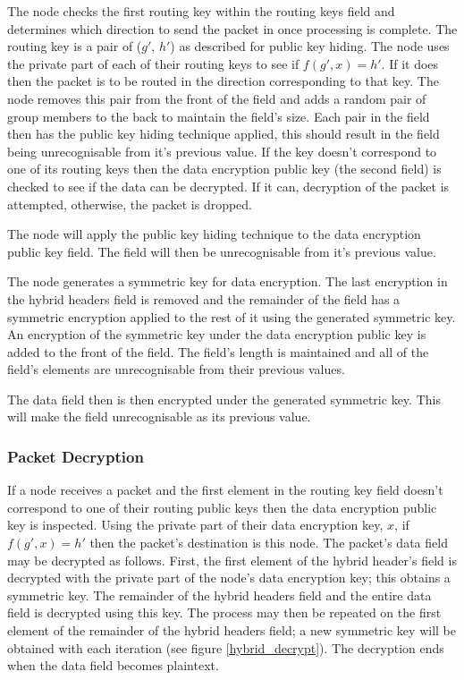 \documentclass[ %
                    author={Luke Murray},
                supervisor={Dr. Simon Hollis},
                     title={Shadow Peer-to-Peer Networks},
                  subtitle={},
                    degree={MEng},
                      year={2013} ]{thesis}
\begin{document}
The node checks the first routing key within the routing keys field and determines which direction to send the packet in once processing is complete. The routing key is a pair of ($g\prime$, $h\prime$) as described for public key hiding. The node uses the private part of each of their routing keys to see if $f(g\prime, x) = h\prime$. If it does then the packet is to be routed in the direction corresponding to that key. The node removes this pair from the front of the field and adds a random pair of group members to the back to maintain the field's size. Each pair in the field then has the public key hiding technique applied, this should result in the field being unrecognisable from it's previous value. If the key doesn't correspond to one of its routing keys then the data encryption public key (the second field) is checked to see if the data can be decrypted. If it can, decryption of the packet is attempted, otherwise, the packet is dropped.

The node will apply the public key hiding technique to the data encryption public key field. The field will then be unrecognisable from it's previous value.

The node generates a symmetric key for data encryption. The last encryption in the hybrid headers field is removed and the remainder of the field has a symmetric encryption applied to the rest of it using the generated symmetric key. An encryption of the symmetric key under the data encryption public key is added to the front of the field. The field's length is maintained and all of the field's elements are unrecognisable from their previous values.

The data field then is then encrypted under the generated symmetric key. This will make the field unrecognisable as its previous value.

\subsubsection{Packet Decryption}

If a node receives a packet and the first element in the routing key field doesn't correspond to one of their routing public keys then the data encryption public key is inspected. Using the private part of their data encryption key, $x$, if $f(g\prime, x) = h\prime$ then the packet's destination is this node. The packet's data field may be decrypted as follows. First, the first element of the hybrid header's field is decrypted with the private part of the node's data encryption key; this obtains a symmetric key. The remainder of the hybrid headers field and the entire data field is decrypted using this key. The process may then be repeated on the first element of the remainder of the hybrid headers field; a new symmetric key will be obtained with each iteration (see figure \ref{hybrid_decrypt}). The decryption ends when the data field becomes plaintext.
\end{document}
